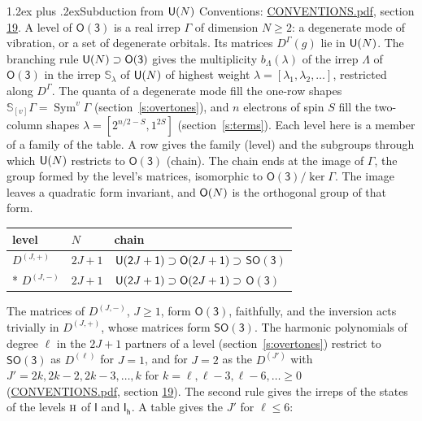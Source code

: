 \documentclass[10pt,a4paper]{article}
\makeatletter
\renewcommand\section{\@startsection{section}{1}{\z@}{-3ex plus -1ex minus -.2ex}%
  {1.2ex plus .2ex}{\normalfont\large\sffamily\bfseries\color{parttitle}}}
\numberwithin{equation}{section}
\newcommand{\grp}[1]{\mathsf{#1}}
\newcommand{\irr}[1]{\text{\normalfont\scshape #1}}
\newcommand{\irrJ}[1]{D^{(#1)}}
\newcommand{\irrJp}[2]{D^{(#1,#2)}}
\newcommand{\repD}[1]{D^{#1}}
\newcommand{\schur}[1]{\mathbb{S}_{#1}}
\newcommand{\shape}[1]{[#1]}
\makeatother
\begin{document}
\section{Subduction from \texorpdfstring{$\grp{U(\mathnormal{N})}$}{U(N)}}\label{s:unitary}
Conventions: \href{../../CONVENTIONS.pdf}{CONVENTIONS.pdf}, section \href{../../CONVENTIONS.pdf\#conv.19}{19}.
\leavevmode\label{n:local.level.dimension}A level of $\grp{O(3)}$ is a real irrep $\Gamma$ of dimension $N \ge 2$: a degenerate mode of vibration, or a set of degenerate orbitals. \label{n:group.unitary}Its matrices $\repD{\Gamma}(g)$ lie in $\grp{U(\mathnormal{N})}$. \label{n:irrep.schur}\label{n:shape.partition}\label{n:local.partition}\label{n:function.multiplicity.unitary}The branching rule $\grp{U(\mathnormal{N})} \supset \grp{O(3)}$ gives the multiplicity $b_\Lambda(\lambda)$ of the irrep $\Lambda$ of $\grp{O(3)}$ in the irrep $\schur{\lambda}$ of $\grp{U(\mathnormal{N})}$ of highest weight $\lambda = \shape{\lambda_1, \lambda_2, \dots}$, restricted along $\repD{\Gamma}$. \label{n:local.partition.power}\label{n:local.electrons}\label{n:local.spin}The quanta of a degenerate mode fill the one-row shapes $\schur{\shape{v}}\Gamma = \operatorname{Sym}^{v}\Gamma$ (section~\ref{s:overtones}), and $n$ electrons of spin $S$ fill the two-column shapes $\lambda = \shape{2^{n/2-S}, 1^{2S}}$ (section~\ref{s:terms}).
Each level here is a member of a family of the table. \label{n:head.level}\label{n:head.chain}A row gives the family (level) and the subgroups through which $\grp{U(\mathnormal{N})}$ restricts to $\grp{O(3)}$ (chain). The chain ends at the image of $\Gamma$, the group formed by the level's matrices, isomorphic to $\grp{O(3)}/\ker\Gamma$. The image leaves a quadratic form invariant, and $\grp{O(\mathnormal{N})}$ is the orthogonal group of that form.
{\small\begin{longtable}{@{}lll@{}}\toprule
level & $N$ & chain\\\midrule\endhead
\bottomrule\endfoot\endlastfoot
$\irrJp{J}{+}$ & $2J+1$ & $\grp{U(2\mathnormal{J}+1)} \supset \grp{O(2\mathnormal{J}+1)} \supset$ \href{SO3.pdf}{$\grp{SO(3)}$}\\*
$\irrJp{J}{-}$ & $2J+1$ & $\grp{U(2\mathnormal{J}+1)} \supset \grp{O(2\mathnormal{J}+1)} \supset$ $\grp{O(3)}$\\
\bottomrule\end{longtable}}
The matrices of $\irrJp{J}{-}$, $J \ge 1$, form $\grp{O(3)}$, faithfully, and the inversion acts trivially in $\irrJp{J}{+}$, whose matrices form \href{SO3.pdf}{$\grp{SO(3)}$}. \label{n:index.harmonic.degree}\label{n:index.constituent}The harmonic polynomials of degree $\ell$ in the $2J + 1$ partners of a level (section~\ref{s:overtones}) restrict to \href{SO3.pdf}{$\grp{SO(3)}$} as $\irrJ{\ell}$ for $J = 1$, and for $J = 2$ as the $\irrJ{J'}$ with $J' = 2k, 2k - 2, 2k - 3, \dots, k$ for $k = \ell, \ell - 3, \ell - 6, \dots \ge 0$ (\href{../../CONVENTIONS.pdf}{CONVENTIONS.pdf}, section \href{../../CONVENTIONS.pdf\#conv.19}{19}). The second rule gives the irreps of the states of the levels $\irr{h}$ of \href{I.pdf}{$\grp{I}$} and \href{Ih.pdf}{$\grp{I_{h}}$}. A table gives the $J'$ for $\ell \le 6$:
\end{document}
